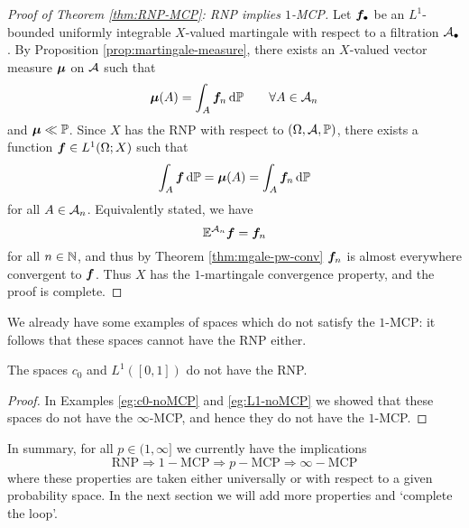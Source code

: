 \begin{proof}[Proof of Theorem \ref{thm:RNP-MCP}: RNP implies $1$-MCP]
  Let $\bm{f}_{\bullet}$ be an $L^1$-bounded uniformly integrable $X$-valued martingale with respect to a filtration $\mathcal{A}_{\bullet}$.
  By Proposition \ref{prop:martingale-measure}, there exists an $X$-valued vector measure $\bm{\mu}$ on $\mathcal{A}$ such that
  \begin{equation*}
    \bm{\mu}(A) = \int_{A} \bm{f}_n \, \mathrm{d}\mathbb{P} \qquad \forall A \in \mathcal{A}_n
  \end{equation*}
  and $\bm{\mu} \ll \mathbb{P}$.
  Since $X$ has the RNP with respect to $(\Omega,\mathcal{A},\mathbb{P})$, there exists a function $\bm{f} \in L^1(\Omega;X)$ such that
  \begin{equation*}
    \int_{A} \bm{f} \, \mathrm{d}\mathbb{P} = \bm{\mu}(A) = \int_A \bm{f}_n \, \mathrm{d}\mathbb{P}
  \end{equation*}
  for all $A \in \mathcal{A}_n$.
  Equivalently stated, we have
  \begin{equation*}
    \mathbb{E}^{\mathcal{A}_n} \bm{f} = \bm{f}_n
  \end{equation*}
  for all $n \in \mathbb{N}$, and thus by Theorem \ref{thm:mgale-pw-conv} $\bm{f}_n$ is almost everywhere convergent to $\bm{f}$.
  Thus $X$ has the $1$-martingale convergence property, and the proof is complete.
\end{proof}

We already have some examples of spaces which do not satisfy the $1$-MCP: it follows that these spaces cannot have the RNP either.

\begin{cor}
  The spaces $c_0$ and $L^1([0,1])$ do not have the RNP.
\end{cor}

\begin{proof}
  In Examples \ref{eg:c0-noMCP} and \ref{eg:L1-noMCP} we showed that these spaces do not have the $\infty$-MCP, and hence they do not have the $1$-MCP. 
\end{proof} %

In summary, for all $p \in (1,\infty]$ we currently have the implications
\begin{equation*}
  \mathrm{RNP} \Longrightarrow 1-\mathrm{MCP} \Longrightarrow p-\mathrm{MCP} \Longrightarrow \infty-\mathrm{MCP}
\end{equation*}
where these properties are taken either universally or with respect to a given probability space.
In the next section we will add more properties and `complete the loop'.

